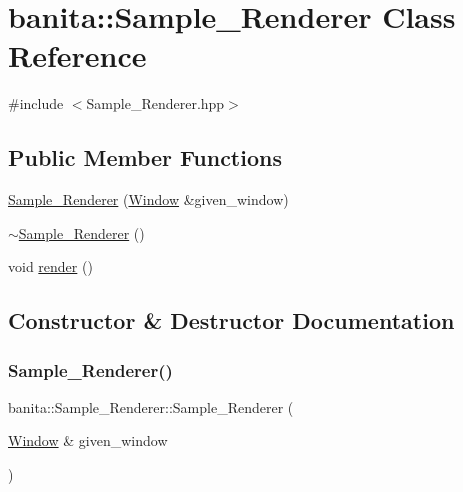 \hypertarget{classbanita_1_1_sample___renderer}{}\section{banita\+::Sample\+\_\+\+Renderer Class Reference}
\label{classbanita_1_1_sample___renderer}


{\ttfamily \#include $<$Sample\+\_\+\+Renderer.\+hpp$>$}

\subsection*{Public Member Functions}
\begin{DoxyCompactItemize}
\item 
\mbox{\hyperlink{classbanita_1_1_sample___renderer_a73aa68cac1111711f074bdadfde96c2f}{Sample\+\_\+\+Renderer}} (\mbox{\hyperlink{classbanita_1_1_window}{Window}} \&given\+\_\+window)
\item 
\mbox{\hyperlink{classbanita_1_1_sample___renderer_a6e8c46345456cc3975348b2d79924183}{$\sim$\+Sample\+\_\+\+Renderer}} ()
\item 
void \mbox{\hyperlink{classbanita_1_1_sample___renderer_aa4b50327809ca20efcfda16117f237d1}{render}} ()
\end{DoxyCompactItemize}


\subsection{Constructor \& Destructor Documentation}
\mbox{\label{classbanita_1_1_sample___renderer_a73aa68cac1111711f074bdadfde96c2f}} 
\subsubsection{\texorpdfstring{Sample\_Renderer()}{Sample\_Renderer()}}
{\footnotesize\ttfamily banita\+::\+Sample\+\_\+\+Renderer\+::\+Sample\+\_\+\+Renderer (\begin{DoxyParamCaption}\item[{\mbox{\hyperlink{classbanita_1_1_window}{Window}} \&}]{given\+\_\+window }\end{DoxyParamCaption})}


